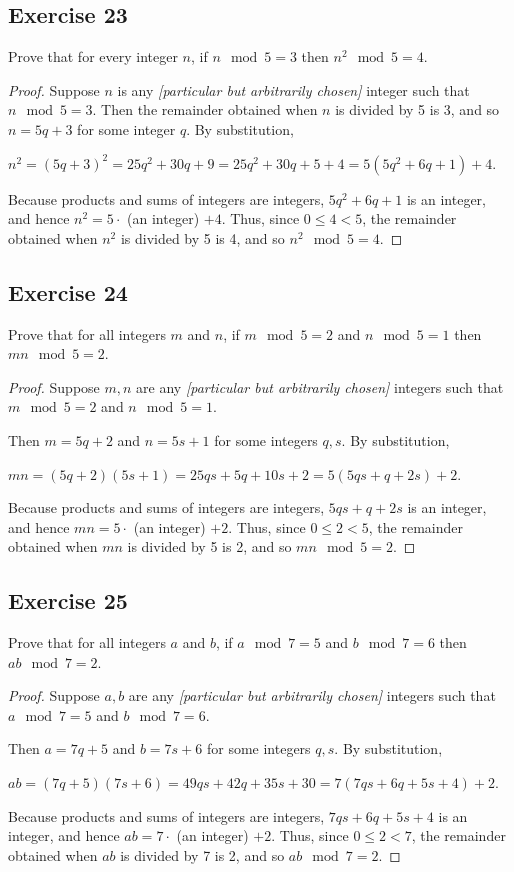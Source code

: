 \documentclass[14pt]{extarticle}
\begin{document}
\subsection{Exercise 23}
Prove that for every integer $n$, if $n \mod 5 = 3$ then
$n^2 \mod 5 = 4$.

\begin{proof}
    Suppose $n$ is any {\it [particular but arbitrarily chosen]} integer such that $n \mod 5 = 3$. Then the remainder obtained when $n$ is divided by 5 is 3, and so $n = 5q + 3$ for some integer $q$. By substitution,

    $n^2 = (5q + 3)^2 = 25q^2 + 30q + 9 = 25q^2 + 30q + 5 + 4 = 5(5q^2 + 6q + 1) + 4$.

    Because products and sums of integers are integers, $5q^2 + 6q + 1$ is an integer, and hence $n^2 = 5\cdot$ (an integer) $+ 4$. Thus, since $0 \leq 4 < 5$, the remainder obtained when $n^2$ is divided by 5 is 4, and so $n^2 \mod 5 = 4$.
\end{proof}

\subsection{Exercise 24}
Prove that for all integers $m$ and $n$, if $m \mod 5 = 2$
and $n \mod 5 = 1$ then $mn \mod 5 = 2$.

\begin{proof}
    Suppose $m,n$ are any {\it [particular but arbitrarily chosen]} integers such that $m \mod 5 = 2$ and $n \mod 5 = 1$.

    Then $m = 5q + 2$ and $n = 5s + 1$ for some integers $q,s$. By substitution,

    $mn = (5q + 2)(5s+1) = 25qs + 5q + 10s + 2 = 5(5qs + q + 2s) + 2$.

    Because products and sums of integers are integers, $5qs + q + 2s$ is an integer, and hence $mn = 5\cdot$ (an integer) $+ 2$. Thus, since $0 \leq 2 < 5$, the remainder obtained when $mn$ is divided by 5 is 2, and so $mn \mod 5 = 2$.
\end{proof}

\subsection{Exercise 25}
Prove that for all integers $a$ and $b$, if $a \mod 7 = 5$ and $b \mod 7 = 6$ then $ab \mod 7 = 2$.

\begin{proof}
    Suppose $a,b$ are any {\it [particular but arbitrarily chosen]} integers such that $a \mod 7 = 5$ and $b \mod 7 = 6$.

    Then $a = 7q + 5$ and $b = 7s + 6$ for some integers $q,s$. By substitution,

    $ab = (7q + 5)(7s+6) = 49qs + 42q + 35s + 30 = 7(7qs + 6q + 5s + 4) + 2$.

    Because products and sums of integers are integers, $7qs + 6q + 5s + 4$ is an integer, and hence $ab = 7\cdot$ (an integer) $+ 2$. Thus, since $0 \leq 2 < 7$, the remainder obtained when $ab$ is divided by 7 is 2, and so $ab \mod 7 = 2$.
\end{proof}
\end{document}

